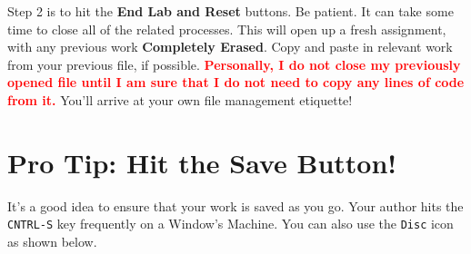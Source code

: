 Step 2 is to hit the \textbf{End Lab and Reset} buttons. Be patient. It can take some time to close all of the related processes. This will open up a fresh assignment, with any previous work \textbf{Completely Erased}. Copy and paste in relevant work from your previous file, if possible. \textcolor{red}{\bf Personally, I do not close my previously opened file until I am sure that I do not need to copy any lines of code from it.} You'll arrive at your own file management etiquette!\\

\setlength{\fboxrule}{3pt}%
	\centerline{ %
}
\begin{center}
    \end{center}


\vspace*{.2cm}

\setlength{\fboxrule}{3pt}%
	\centerline{ %
}


\section{Pro Tip: Hit the Save Button!}

It's a good idea to ensure that your work is saved as you go. Your author hits the \texttt{CNTRL-S} key frequently on a Window's Machine. You can also use the \texttt{Disc} icon as shown below.\\

